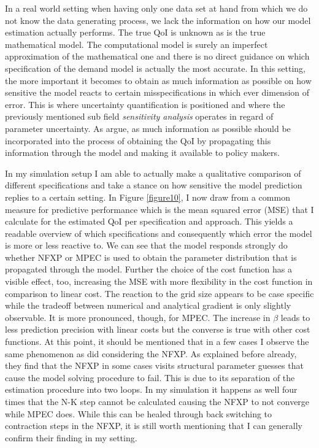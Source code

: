 In a real world setting when having only one data set at hand from which we do not know the data generating process, we lack the information on how our model estimation actually performs. The true QoI is unknown as is the true mathematical model. The computational model is surely an imperfect approximation of the mathematical one and there is no direct guidance on which specification of the demand model is actually the most accurate. In this setting, the more important it becomes to obtain as much information as possible on how sensitive the model reacts to certain misspecifications in which ever dimension of error. This is where uncertainty quantification is positioned and where the previously mentioned sub field \textit{sensitivity analysis} operates in regard of parameter uncertainty. As \cite{Oberkampf.2010} argue, as much information as possible should be incorporated into the process of obtaining the QoI by propagating this information through the model and making it available to policy makers.

In my simulation setup I am able to actually make a qualitative comparison of different specifications and take a stance on how sensitive the model prediction replies to a certain setting. In Figure \ref{figure10}, I now draw from a common measure for predictive performance which is the mean squared error (MSE) that I calculate for the estimated QoI per specification and approach. This yields a readable overview of which specifications and consequently which error the model is more or less reactive to. We can see that the model responds strongly do whether NFXP or MPEC is used to obtain the parameter distribution that is propagated through the model. Further the choice of the cost function has a visible effect, too, increasing the MSE with more flexibility in the cost function in comparison to linear cost. The reaction to the grid size appears to be case specific while the tradeoff between numerical and analytical gradient is only slightly observable. It is more pronounced, though, for MPEC. The increase in $\beta$ leads to less prediction precision with linear costs but the converse is true with other cost functions. At this point, it should be mentioned that in a few cases I observe the same phenomenon as \cite{Dong.Hsieh.Zhang.2017} did considering the NFXP. As explained before already, they find that the NFXP in some cases visits structural parameter guesses that cause the model solving procedure to fail. This is due to its separation of the estimation procedure into two loops. In my simulation it happens as well four times that the N-K step cannot be calculated causing the NFXP to not converge while MPEC does. While this can be healed through back switching to contraction steps in the NFXP, it is still worth mentioning that I can generally confirm their finding in my setting.


